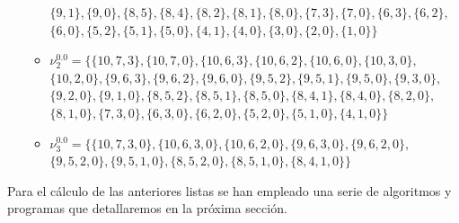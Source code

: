 \documentclass[12pt, a4paper, twoside]{book}
\numberwithin{equation}{section}
\theoremstyle{definition}
\newenvironment{ejem}
  {\pushQED{\qed}\renewcommand{\qedsymbol}{$\blacktriangleleft$}\ejemplo}
  {\popQED\endejemplo}
\theoremstyle{remark}
\theoremstyle{plain}
\begin{document}
\begin{ejem}
\begin{itemize}
\begin{itemize}
						$\{9, 1\},\{9, 0\},\{8, 5\},\{8, 4\},\{8, 2\},\{8, 1\},\{8, 0\},\{7, 3\},\{7, 0\},\{6, 3\},\{6, 2\},$\\
					$\{6, 0\},\{5, 2\},\{5, 1\},\{5, 0\},\{4, 1\},\{4, 0\},\{3, 0\},\{2, 0\},\{1, 0\}\}$
					\item {\Large $\nu$}$^{0.0}_{2}=\{\{10, 7, 3\},\{10, 7, 0\},\{10, 6, 3\},\{10, 6, 2\},\{10, 6, 0\},\{10, 3, 0\},$\\
							$\{10, 2, 0\},\{9, 6, 3\},\{9, 6, 2\},\{9, 6, 0\},\{9, 5, 2\},\{9, 5, 1\},\{9, 5, 0\},\{9, 3, 0\},$\\
							$\{9, 2, 0\},\{9, 1, 0\},\{8, 5, 2\},\{8, 5, 1\},\{8, 5, 0\},\{8, 4, 1\},\{8, 4, 0\},\{8, 2, 0\},$\\
						$\{8, 1, 0\},\{7, 3, 0\},\{6, 3, 0\},\{6, 2, 0\},\{5, 2, 0\},\{5, 1, 0\},\{4, 1, 0\}\}$
					\item {\Large $\nu$}$^{0.0}_{3}=\{\{10, 7, 3, 0\},\{10, 6, 3, 0\},\{10, 6, 2, 0\},\{9, 6, 3, 0\},\{9, 6, 2, 0\},$\\
						$\{9, 5, 2, 0\},\{9, 5, 1, 0\},\{8, 5, 2, 0\},\{8, 5, 1, 0\},\{8, 4, 1, 0\}\}$
				\end{itemize}
		\end{itemize}
	Para el cálculo de las anteriores listas se han empleado una serie de 
	algoritmos y programas que detallaremos en la próxima sección.


\end{ejem}
\end{document}
